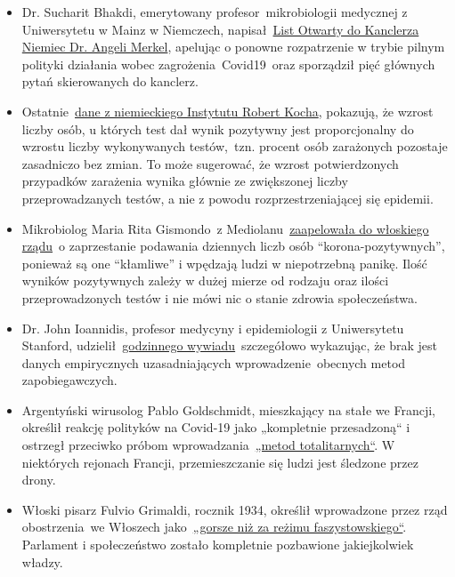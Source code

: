 \begin{itemize}
\tightlist
\item
  Dr. Sucharit Bhakdi, emerytowany profesor~mikrobiologii medycznej z
  Uniwersytetu w Mainz w Niemczech,
  napisał~\href{https://swprs.org/open-letter-from-professor-sucharit-bhakdi-to-german-chancellor-dr-angela-merkel/}{List
  Otwarty do Kanclerza Niemiec Dr. Angeli Merkel}, apelując o ponowne
  rozpatrzenie w trybie pilnym polityki działania wobec
  zagrożenia~Covid19~oraz sporządził pięć głównych pytań skierowanych do
  kanclerz.
\item
  Ostatnie~\href{https://multipolar-magazin.de/artikel/coronavirus-irrefuhrung-fallzahlen}{dane
  z niemieckiego Instytutu Robert Kocha}, pokazują, że wzrost liczby
  osób, u których test dał wynik pozytywny jest proporcjonalny do
  wzrostu liczby wykonywanych testów,~tzn. procent osób zarażonych
  pozostaje zasadniczo bez zmian. To może sugerować, że wzrost
  potwierdzonych przypadków zarażenia wynika głównie ze zwiększonej
  liczby przeprowadzanych testów, a nie z powodu rozprzestrzeniającej
  się epidemii.
\item
  Mikrobiolog Maria Rita Gismondo~z
  Mediolanu~\href{https://www.secoloditalia.it/2020/03/coronavirus-la-gismondo-ammonisce-duramente-basta-snocciolare-numeri-sui-positivi-sono-dati-falsati/}{zaapelowała
  do włoskiego rządu}~o zaprzestanie podawania dziennych liczb osób
  ``korona-pozytywnych'', ponieważ są one ``kłamliwe'' i wpędzają ludzi
  w niepotrzebną panikę. Ilość wyników pozytywnych zależy w dużej mierze
  od rodzaju oraz ilości przeprowadzonych testów i nie mówi nic o stanie
  zdrowia społeczeństwa.
\item
  Dr. John Ioannidis, profesor medycyny i epidemiologii z Uniwersytetu
  Stanford,
  udzielił~\href{https://www.youtube.com/watch?v=d6MZy-2fcBw}{godzinnego
  wywiadu}~szczegółowo wykazując, że brak jest danych empirycznych
  uzasadniających wprowadzenie~obecnych metod zapobiegawczych.
\item
  Argentyński wirusolog Pablo Goldschmidt, mieszkający na stałe we
  Francji, określił reakcję polityków na Covid-19 jako „kompletnie
  przesadzoną`` i ostrzegł przeciwko próbom
  wprowadzania~\href{https://www.infobae.com/coronavirus/2020/03/28/para-un-prestigioso-cientifico-argentino-el-coronavirus-no-merece-que-el-planeta-este-en-un-estado-de-parate-total/}{„metod
  totalitarnych``}. W niektórych rejonach Francji, przemieszczanie się
  ludzi jest śledzone przez drony.
\item
  Włoski pisarz Fulvio Grimaldi, rocznik 1934, określił wprowadzone
  przez rząd obostrzenia~we Włoszech
  jako~\href{https://www.youtube.com/watch?v=O3BuNp01vpc}{„gorsze niż za
  reżimu faszystowskiego``}. Parlament i społeczeństwo zostało
  kompletnie pozbawione jakiejkolwiek władzy.
\end{itemize}

